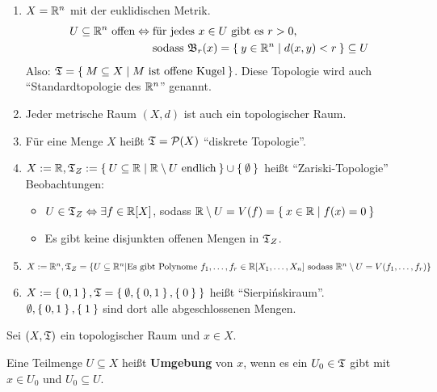 \begin{beispiel}
    \begin{enumerate}[label=\arabic*)]
        \item $X = \mathbb{R}^n$ mit der euklidischen Metrik. 
              \begin{align*}
                U \subseteq \mathbb{R}^n \text{ offen} \Leftrightarrow\;&\text{für jedes $x \in U$ gibt es $r > 0$,}\\
                                                       &\text{sodass $\mathfrak{B}_r(x) = \Set{y \in \ensuremath{\mathbb{R}}^n | d(x,y) < r} \subseteq U$}
              \end{align*}
              Also: $\mathfrak{T} = \Set{M \subseteq X | M \text{ ist offene Kugel}}$. 
              Diese Topologie wird auch \enquote{Standardtopologie des $\mathbb{R}^n$} genannt.
        \item Jeder metrische Raum $(X, d)$ ist auch ein topologischer Raum.
        \item Für eine Menge $X$ heißt $\mathfrak{T} = \mathcal{P}(X)$ \enquote{diskrete Topologie}.
        \item $X :=\mathbb{R}, \mathfrak{T}_Z := \Set{U \subseteq \ensuremath{\mathbb{R}}| \ensuremath{\mathbb{R}}\setminus U \text{ endlich}} \cup \Set{\emptyset}$ heißt \enquote{Zariski-Topologie} \\
              Beobachtungen: 
            \begin{itemize}
                \item $U \in \mathfrak{T}_Z \Leftrightarrow \exists f \in \mathbb{R}[X]$, sodass $\mathbb{R} \setminus U = V(f) = \Set{x \in \ensuremath{\mathbb{R}}| f(x) = 0}$
                \item Es gibt keine disjunkten offenen Mengen in $\mathfrak{T}_Z$.
            \end{itemize}
        \item $X := \mathbb{R}^n, \mathfrak{T}_Z = \{U \subseteq \mathbb{R}^n | \text{Es gibt Polynome } f_1, \dots, f_r \in \mathbb{R}[X_1, \dots, X_n] \text{ sodass }\\\mathbb{R}^n \setminus U = V(f_1, \dots, f_r)\}$
        \item $X := \Set{0,1}, \mathfrak{T} = \Set{\emptyset, \Set{0,1}, \Set{0}}$ heißt \enquote{Sierpińskiraum}.\\
              $\emptyset, \Set{0,1}, \Set{1}$ sind dort alle abgeschlossenen Mengen.
    \end{enumerate}
\end{beispiel}

\begin{definition} 
    Sei $(X, \mathfrak{T})$ ein topologischer Raum und $x \in X$.

    Eine Teilmenge $U \subseteq X$ heißt \textbf{Umgebung} von $x$,
    wenn es ein $U_0 \in \mathfrak{T}$ gibt mit $x \in U_0$ und $U_0 \subseteq U$.
\end{definition}

